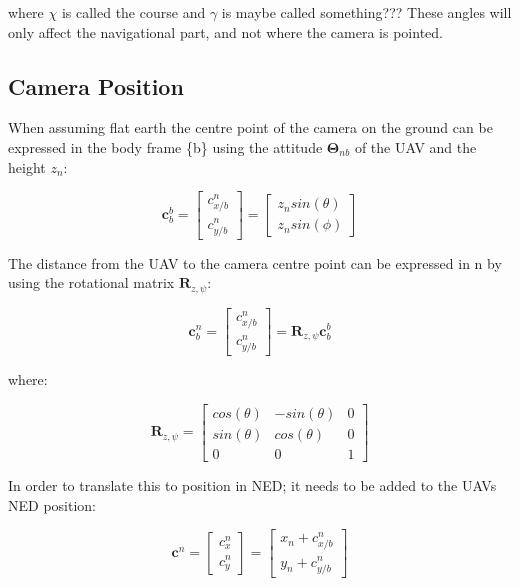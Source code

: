 where $\chi$ is called the course and $\gamma$ is maybe called something??? These angles will only affect the navigational part, and not where the camera is pointed.


\subsection{Camera Position}
When assuming flat earth the centre point of the camera on the ground can be expressed in the body frame \{b\} using the attitude $\bm{\Theta}_{nb}$ of the UAV and the height $z_n$:

\begin{equation} \label{eq:camera_pos}
	\bm{c}_b^b =
	\begin{bmatrix}
		c_{x/b}^n \\
		c_{y/b}^n
	\end{bmatrix}
	=
	\begin{bmatrix}
		z_n sin(\theta) \\
		z_n sin(\phi)
	\end{bmatrix}
\end{equation}

The distance from the UAV to the camera centre point can be expressed in {n} by using the rotational matrix $\bm{R}_{z,\psi}$:

\begin{equation} \label{eq:body_ned_rotate}
	\bm{c}_b^n =
	\begin{bmatrix}
		c_{x/b}^n \\
		c_{y/b}^n
	\end{bmatrix}
	= \bm{R}_{z,\psi} \bm{c}_b^b
\end{equation}

where:

\begin{equation}
	\bm{R}_{z,\psi} = 
	\begin{bmatrix}
		cos(\theta) & -sin(\theta) & 0 \\
		sin(\theta) & cos(\theta) & 0 \\
		0 & 0 & 1
	\end{bmatrix}
\end{equation}
	

In order to translate this to position in NED; it needs to be added to the UAVs NED position:

\begin{equation} \label{eq:body_ned_trans}
	\bm{c}^n =
	\begin{bmatrix}
		c_x^n \\ c_y^n
	\end{bmatrix}
	=
	\begin{bmatrix}
		x_n + c_{x/b}^n \\
		y_n + c_{y/b}^n
	\end{bmatrix}
\end{equation}

